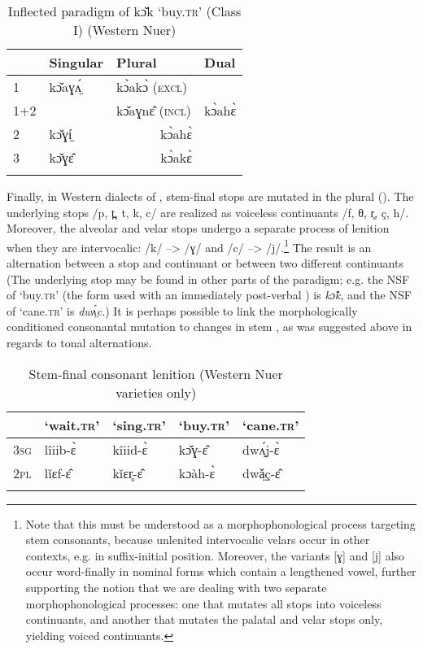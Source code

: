 \documentclass[output=paper,newtxmath,modfonts,nonflat,draftmode]{langsci/langscibook}
\begin{document}
\begin{table} 
\begin{tabularx}{\textwidth}{XXXl} 
\lsptoprule
& Singular &{Plural} & Dual\\
\midrule
1 & kɔ̌aɣʌ̤́ & {kɔ̀akɔ̀ (\textsc{excl})} \\
1+2  &      &  kɔ̌aɣnɛ̂ (\textsc{incl}) & kɔ̀ahɛ̀ \\
2 & kɔ̌ɣí̤ & \multicolumn{2}{c}{kɔ̀ahɛ̀}\\
3 & kɔ̌ɣɛ̂ & \multicolumn{2}{c}{kɔ̀akɛ̀}\\
\lspbottomrule
\end{tabularx}
\caption{Inflected paradigm of kɔ̌k ‘buy.\textsc{tr}’ (Class I) (Western Nuer)}
\label{tab:monich:10}
\end{table}

Finally, in Western dialects of , stem-final stops are mutated in the plural (). The underlying stops /p, t̪, t, k, c/ are realized as voiceless continuants /f, θ, r̥, ç, h/. Moreover, the alveolar and velar stops undergo a separate process of lenition when they are intervocalic: /k/ --> /ɣ/ and /c/ --> /j/.\footnote{Note\label{fn:monich:8} that this must be understood as a morphophonological process targeting stem consonants, because unlenited intervocalic velars occur in other contexts, e.g. in suffix-initial position. Moreover, the variants [ɣ] and [j] also occur word-finally in nominal forms which contain a lengthened vowel, further supporting the notion that we are dealing with two separate morphophonological  processes: one that mutates all stops into voiceless continuants, and another that mutates the palatal and velar stops only, yielding voiced continuants.} The result is an alternation between a stop and continuant or between two different continuants (The underlying stop may be found in other parts of the paradigm; e.g. the NSF of ‘buy.\textsc{tr}’ (the form used with an immediately post-verbal ) is \textit{kɔ̂k}, and the NSF of ‘cane.\textsc{tr}’ is \textit{dwʌ̤́c}.) It is perhaps possible to link the morphologically conditioned consonantal mutation to changes in stem , as was suggested above in regards to tonal alternations.

\begin{table}
\begin{tabularx}{\textwidth}{XXXXX} 
\lsptoprule
& ‘wait.\textsc{tr}’ & ‘sing.\textsc{tr}’ & ‘buy.\textsc{tr}’ & ‘cane.\textsc{tr}’\\
\midrule
3\textsc{sg} & lîiib-ɛ̀ & kîiid-ɛ̀ & kɔ̌ɣ-ɛ̂ & dwʌ̤́j-ɛ̀\\
2\textsc{pl} & lǐɛf-ɛ̂ & kǐɛr̥-ɛ̂ & kɔàh-ɛ̀ & dwǎ̤ç-ɛ̂\\
\lspbottomrule
\end{tabularx}
\caption{Stem-final consonant lenition (Western Nuer varieties only)}
\label{tab:monich:11}
\end{table}
\end{document}

